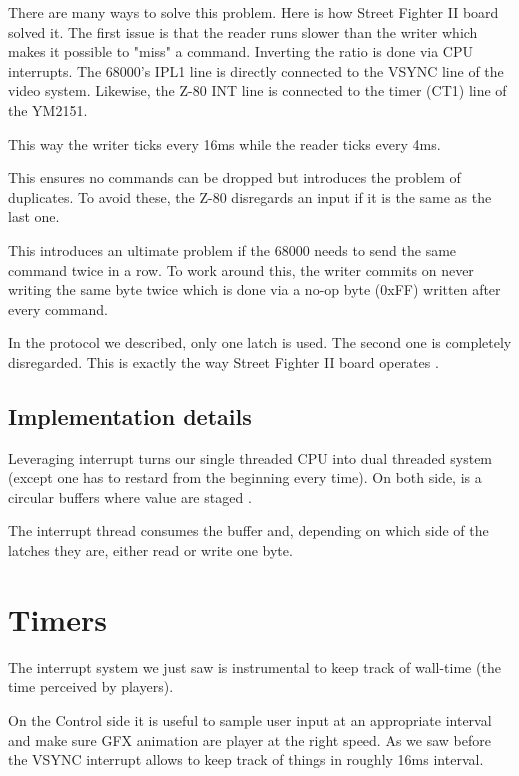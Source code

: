 There are many ways to solve this problem. Here is how Street Fighter II board solved it. The first issue is that the reader runs slower than the writer which makes it possible to "miss" a command. Inverting the ratio is done via CPU interrupts. The 68000's IPL1 line is directly connected to the VSYNC line of the video system. Likewise, the Z-80 INT line is connected to the timer (CT1) line of the YM2151.


This way the writer ticks every 16ms while the reader ticks every 4ms. 


This ensures no commands can be dropped but introduces the problem of duplicates. To avoid these, the Z-80 disregards an input if it is the same as the last one.

This introduces an ultimate problem if the 68000 needs to send the same command twice in a row. To work around this, the writer commits on never writing the same byte twice which is done via a no-op byte (0xFF) written after every command.


\begin{trivia}
In the protocol we described, only one latch is used. The second one is completely disregarded. This is exactly the way Street Fighter II board operates	.
\end{trivia}

\subsection{Implementation details}
Leveraging interrupt turns our single threaded CPU into dual threaded system (except one has to restard from the beginning every time). On both side, is a circular buffers where value are staged	.

The interrupt thread consumes the buffer and, depending on which side of the latches they are, either read or write one byte.
\pagebreak


\section{Timers}
The interrupt system we just saw is instrumental to keep track of wall-time (the time perceived by players). 

On the Control side it is useful to sample user input at an appropriate interval and make sure GFX animation are player at the right speed. As we saw before the VSYNC interrupt allows to keep track of things in roughly 16ms interval.

